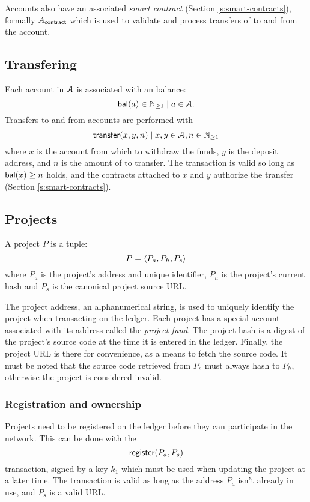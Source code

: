 Accounts also have an associated \emph{smart contract} (Section
\ref{s:smart-contracts}), formally $A_{\mathsf{contract}}$ which is used to
validate and process transfers of \oscoin{} to and from the account.

\subsection{Transfering \oscoin{}}
\label{s:transfering}

Each account in $\mathcal{A}$ is associated with an \oscoin{} balance:
\[
    \mathsf{bal}(a) \in \mathbb{N}_{\geq 1} \mid a \in \mathcal{A}.
\]
Transfers to and from accounts are performed with
\[
    \mathsf{transfer}\lparen x,y,n\rparen \mid x,y \in \mathcal{A}, n \in \mathbb{N}_{\geq 1}
\]
where $x$ is the account from which to withdraw the funds, $y$ is the deposit
address, and $n$ is the amount of \oscoin{} to transfer.  The transaction is
valid so long as $\mathsf{bal}(x) \geq n$ holds, and the contracts attached to $x$ and
$y$ authorize the transfer (Section \ref{s:smart-contracts}).

\subsection{Projects}
\label{s:projects}

A project $P$ is a tuple:
\[
    P = \langle P_a, P_h, P_s\rangle
\]
where $P_{a}$ is the project's address and unique identifier, $P_h$ is
the project's current hash and $P_s$ is the canonical project source
URL.

The project address, an alphanumerical string, is used to uniquely identify the
project when transacting on the ledger. Each project has a special account
associated with its address called the \emph{project fund}. The project hash is
a digest of the project's source code at the time it is entered in the ledger.
Finally, the project URL is there for convenience, as a means to fetch the
source code.  It must be noted that the source code retrieved from $P_s$ must
always hash to $P_h$, otherwise the project is considered invalid.

\subsubsection{Registration and ownership} Projects need to be
registered on the ledger before they can participate in the
network. This can be done with the
\[
    \mathsf{register}\lparen P_a, P_s\rparen
\]
transaction, signed by a key $k_1$ which must be used when updating the project
at a later time. The transaction is valid as long as the address $P_a$ isn't
already in use, and $P_s$ is a valid URL.

